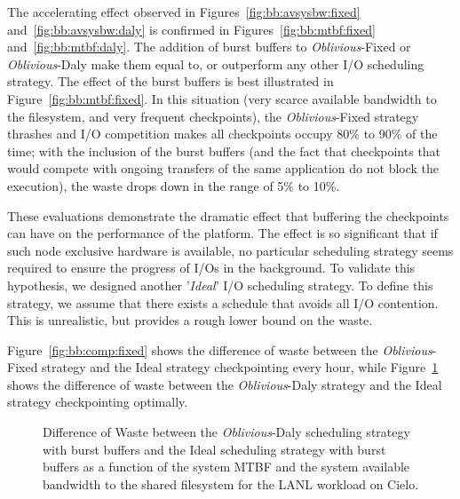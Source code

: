\documentclass[two]{article}
\newcommand{\nocoop}{\emph{Oblivious}\xspace}
\def\propfixed{\nocoop-Fixed\xspace}
\def\propdaly{\nocoop-Daly\xspace}
\begin{document}
The accelerating effect observed in Figures~\ref{fig:bb:avsysbw:fixed}
and~\ref{fig:bb:avsysbw:daly} is confirmed in
Figures~\ref{fig:bb:mtbf:fixed} and~\ref{fig:bb:mtbf:daly}. The
addition of burst buffers to \propfixed or \propdaly make them equal
to, or outperform any other I/O scheduling strategy. The effect of the
burst buffers is best illustrated in
Figure~\ref{fig:bb:mtbf:fixed}. In this situation (very scarce
available bandwidth to the filesystem, and very frequent checkpoints),
the \propfixed strategy thrashes and I/O competition makes all
checkpoints occupy 80\% to 90\% of the time; with the inclusion of
the burst buffers (and the fact that checkpoints that would compete
with ongoing transfers of the same application do not block the
execution), the waste drops down in the range of 5\% to 10\%.

These evaluations demonstrate the dramatic effect that buffering the checkpoints can
have on the performance of the platform. The effect is so significant that if such
node exclusive hardware is available, no particular scheduling strategy seems
required to ensure the progress of I/Os in the background. To validate this
hypothesis, we designed another '\emph{Ideal}' I/O scheduling strategy. To define
this strategy, we assume that there exists a schedule that avoids all I/O contention.
This is unrealistic, but provides a rough lower bound on the waste.

Figure~\ref{fig:bb:comp:fixed} shows the difference of waste between
the \propfixed strategy and the Ideal strategy checkpointing every
hour, while Figure~\ref{fig:bb:comp:daly} shows the difference of
waste between the \propdaly strategy and the Ideal strategy
checkpointing optimally.

\begin{figure}
  \begin{minipage}{0.49\linewidth}
    \begin{center}
      \resizebox{\linewidth}{!}{}
    \end{center}
    \caption{Difference of Waste between the \propfixed scheduling
      strategy with burst buffers and the Ideal scheduling strategy with
      burst buffers as a function of the system MTBF and the system
      available bandwidth to the shared filesystem for the LANL workload on
      Cielo.\label{fig:bb:comp:fixed}}
  \end{minipage}
  \begin{minipage}{0.49\linewidth}
    \begin{center}
      \resizebox{\linewidth}{!}{}
    \end{center}
    \caption{Difference of Waste between the \propdaly scheduling
      strategy with burst buffers and the Ideal scheduling strategy with
      burst buffers as a function of the system MTBF and the system
      available bandwidth to the shared filesystem for the LANL workload on
      Cielo. \label{fig:bb:comp:daly}}
  \end{minipage}
\end{figure}
\end{document}

